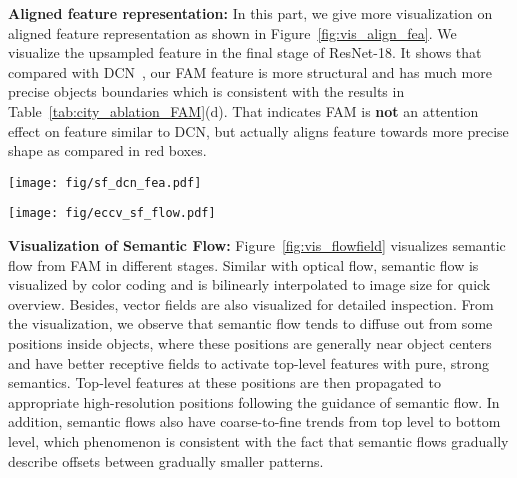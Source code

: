 \noindent
\textbf{Aligned feature representation:} In this part, we give more visualization on aligned feature representation as shown in Figure~\ref{fig:vis_align_fea}. We visualize the upsampled feature in the final stage of ResNet-18. It shows that compared with DCN~\cite{deformable}, our FAM feature is more structural and has much more precise objects boundaries which is consistent with the results in Table~\ref{tab:city_ablation_FAM}(d). That indicates FAM is \textbf{not} an attention effect on feature similar to DCN, but actually aligns feature towards more precise shape as compared in red boxes. 

\begin{figure*}[!t]
	\centering
	\texttt{[image: fig/sf\_dcn\_fea.pdf]}
	\caption{
	Visualization of the aligned feature. Compared with DCN, our module outputs more structural feature representation. 
	}
	\label{fig:vis_align_fea}
\end{figure*}


\begin{figure*}[!t]
	\centering
	\texttt{[image: fig/eccv\_sf\_flow.pdf]}
	\caption{Visualization of the learned semantic flow fields. Column (a) lists three exemplary images. Column (b)-(d) show the semantic flow of the three FAMs in an ascending order of resolution during the decoding process, following the same color coding of Figure~\ref{fig:issue}. Column (e) is the arrowhead visualization of flow fields in column (d). Column (f) contains the segmentation results.
	}
	\label{fig:vis_flowfield}
\end{figure*}


\noindent
\textbf{Visualization of Semantic Flow: } 
Figure~\ref{fig:vis_flowfield} visualizes semantic flow from FAM in different stages. Similar with optical flow, semantic flow is visualized by color coding and is bilinearly interpolated to image size for quick overview. Besides, vector fields are also visualized for detailed inspection. From the visualization, we observe that semantic flow tends to diffuse out from some positions inside objects, where these positions are generally near object centers and have better receptive fields to activate top-level features with pure, strong semantics. Top-level features at these positions are then propagated to appropriate high-resolution positions following the guidance of semantic flow. In addition, semantic flows also have coarse-to-fine trends from top level to bottom level, which phenomenon is consistent with the fact that semantic flows gradually describe offsets between gradually smaller patterns.

